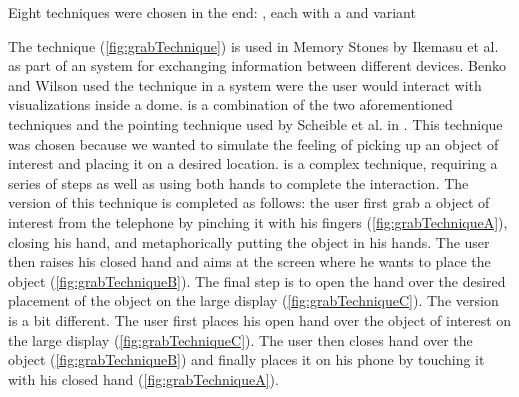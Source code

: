 Eight techniques were chosen in the end: \alltechniques, each with a \push and \pull variant

The \grab technique (\cref{fig:grabTechnique}) is used in Memory Stones \cite{Ikematsu:2015} by Ikemasu et al. as part of an system for exchanging information between different devices. Benko and Wilson \cite{Benko:2010} used the \grab technique in a system were the user would interact with visualizations inside a dome. \grab is a combination of the two aforementioned techniques and the pointing technique used by Scheible et al. in \cite{Scheible:2008}.
This technique was chosen because we wanted to simulate the feeling of picking up an object of interest and placing it on a desired location.
\grab is a complex technique, requiring a series of steps as well as using both hands to complete the interaction.
The \push version of this technique is completed as follows: the user first grab a object of interest from the telephone by pinching it with his fingers (\cref{fig:grabTechniqueA}), closing his hand, and metaphorically putting the object in his hands.
The user then raises his closed hand and aims at the screen where he wants to place the object (\cref{fig:grabTechniqueB}).
The final step is to open the hand over the desired placement of the object on the large display (\cref{fig:grabTechniqueC}).
The \pull version is a bit different.
The user first places his open hand over the object of interest on the large display (\cref{fig:grabTechniqueC}).
The user then closes hand over the object (\cref{fig:grabTechniqueB}) and finally places it on his phone by touching it with his closed hand (\cref{fig:grabTechniqueA}).  


